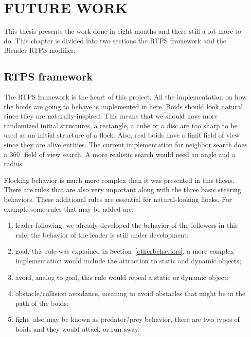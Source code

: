 \chapter{FUTURE WORK}\label{chap8}

This thesis presents the work done in eight months and there still a lot more to do. This chapter is  divided into two sections the RTPS framework and the Blender RTPS modifier.

\section{RTPS framework}

The RTPS framework is the heart of this project. All the implementation on how the boids are going to behave is implemented in here. Boids should look natural since they are naturally-inspired. This means that we should have more randomized initial structures, a rectangle, a cube or a disc are too sharp to be used as an initial structure of a flock. Also, real boids have a limit field of view since they are alive entities. The current implementation for neighbor search does a $360^{\circ}$ field of view search. A more realistic search would need an angle and a radius.

Flocking behavior is much more complex than it was presented in this thesis. There are rules that are also very important along with the three basic steering behaviors. These additional rules are essential for natural-looking flocks. For example some rules that may be added are: 

\begin{enumerate}
\item{leader following, we already developed the behavior of the followers in this rule, the behavior of the leader  is still under development;}
\item{goal, this rule was explained in Section~\ref{otherbehaviors}, a more complex implementation would include the attraction to static and dynamic objects;}
\item{avoid, analog to goal, this rule would repeal a static or dynamic object;} 
\item{obstacle/collision avoidance, meaning to avoid obstacles that might be in the path of the boids;}
\item{fight, also may be known as predator/prey behavior, there are two types of boids and they would attack or run away.}
\end{enumerate}

